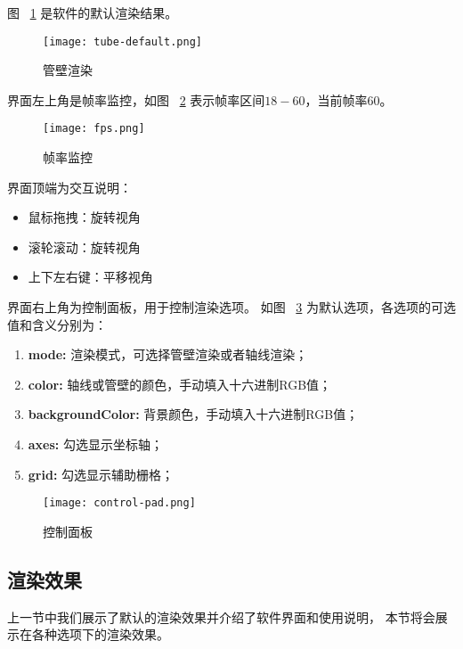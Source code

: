 图 ~\ref{fig:tube-default} 是软件的默认渲染结果。

\FloatBarrier
\begin{figure}
\centering
\texttt{[image: tube-default.png]}
\caption{管壁渲染}
\label{fig:tube-default}
\end{figure}

界面左上角是帧率监控，如图 ~\ref{fig:fps} 表示帧率区间$18-60$，当前帧率$60$。

\begin{figure}
\centering
\texttt{[image: fps.png]}
\caption{帧率监控}
\label{fig:fps}
\end{figure}
\FloatBarrier

界面顶端为交互说明：

\begin{itemize}
\item 鼠标拖拽：旋转视角
\item 滚轮滚动：旋转视角
\item 上下左右键：平移视角
\end{itemize}

界面右上角为控制面板，用于控制渲染选项。
如图 ~\ref{fig:control-pad} 为默认选项，各选项的可选值和含义分别为：

\begin{enumerate}
\item \textbf{mode: }渲染模式，可选择管壁渲染或者轴线渲染；
\item \textbf{color: }轴线或管壁的颜色，手动填入十六进制RGB值；
\item \textbf{backgroundColor: }背景颜色，手动填入十六进制RGB值；
\item \textbf{axes: }勾选显示坐标轴；
\item \textbf{grid: }勾选显示辅助栅格；
\end{enumerate}

\FloatBarrier
\begin{figure}
\centering
\texttt{[image: control-pad.png]}
\caption{控制面板}
\label{fig:control-pad}
\end{figure}
\FloatBarrier

\subsection{渲染效果}
上一节中我们展示了默认的渲染效果并介绍了软件界面和使用说明，
本节将会展示在各种选项下的渲染效果。

